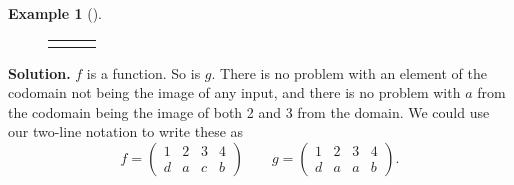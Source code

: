 \documentclass[10pt,]{book}
\theoremstyle{plain}
\theoremstyle{definition}
\newtheorem{example}[theorem]{Example}
\theoremstyle{definition}
\theoremstyle{definition}
\numberwithin{equation}{chapter}
\newlength{\panelmax}
\newcommand{\amp}{ & }
\begin{document}
\begin{example}[]
{{{{}
}}
\newlength{\phRimage}\setlength{\phRimage}{\ht\panelboxRimage+\dp\panelboxRimage}
\settototalheight{\phRimage}{\usebox{\panelboxRimage}}
\setlength{\panelmax}{\maxof{\panelmax}{\phRimage}}
\leavevmode%
\setlength{\tabcolsep}{0.0166666666666667\textwidth}
\begin{figure}
\hspace*{0.0166666666666667\textwidth}%
\begin{tabular}{@{}*{3}{c}@{}}
\begin{minipage}[c][\panelmax][t]{0.3\textwidth}\usebox{\panelboxPimage}\end{minipage}&
\begin{minipage}[c][\panelmax][t]{0.3\textwidth}\usebox{\panelboxQimage}\end{minipage}&
\begin{minipage}[c][\panelmax][t]{0.3\textwidth}\usebox{\panelboxRimage}\end{minipage}\end{tabular}
\end{figure}
}%
\par\medskip\noindent%
\textbf{Solution.}\quad
          \(f\) is a function. So is \(g\). There is no problem with an element of the codomain not being the image of any input, and there is no problem with \(a\) from the codomain being the image of both 2 and 3 from the domain. We could use our two-line notation to write these as
          \begin{equation*}
            f= \begin{pmatrix} 1 \amp 2 \amp 3 \amp 4 \\ d \amp a \amp c \amp b \end{pmatrix} \qquad g = \begin{pmatrix} 1 \amp 2 \amp 3 \amp 4 \\ d \amp a \amp a \amp b \end{pmatrix}.
          \end{equation*}

\par


\end{example}
\end{document}
